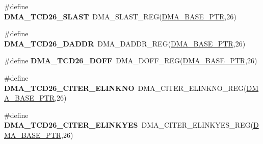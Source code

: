 \begin{DoxyCompactItemize}
\item 
\hypertarget{group___d_m_a___register___accessor___macros_ga3ab01c359b1b2da0d5bd711e9f1a3b26}{}\#define {\bfseries D\+M\+A\+\_\+\+T\+C\+D26\+\_\+\+S\+L\+A\+S\+T}~D\+M\+A\+\_\+\+S\+L\+A\+S\+T\+\_\+\+R\+E\+G(\hyperlink{group___d_m_a___peripheral_ga6997fbc1b1973e9f27170217a3bd6f22}{D\+M\+A\+\_\+\+B\+A\+S\+E\+\_\+\+P\+T\+R},26)\label{group___d_m_a___register___accessor___macros_ga3ab01c359b1b2da0d5bd711e9f1a3b26}

\item 
\hypertarget{group___d_m_a___register___accessor___macros_ga2e65796b0136423acaa261ad3a62a953}{}\#define {\bfseries D\+M\+A\+\_\+\+T\+C\+D26\+\_\+\+D\+A\+D\+D\+R}~D\+M\+A\+\_\+\+D\+A\+D\+D\+R\+\_\+\+R\+E\+G(\hyperlink{group___d_m_a___peripheral_ga6997fbc1b1973e9f27170217a3bd6f22}{D\+M\+A\+\_\+\+B\+A\+S\+E\+\_\+\+P\+T\+R},26)\label{group___d_m_a___register___accessor___macros_ga2e65796b0136423acaa261ad3a62a953}

\item 
\hypertarget{group___d_m_a___register___accessor___macros_gaa03c841d444e3a6a5818a22e141be9c7}{}\#define {\bfseries D\+M\+A\+\_\+\+T\+C\+D26\+\_\+\+D\+O\+F\+F}~D\+M\+A\+\_\+\+D\+O\+F\+F\+\_\+\+R\+E\+G(\hyperlink{group___d_m_a___peripheral_ga6997fbc1b1973e9f27170217a3bd6f22}{D\+M\+A\+\_\+\+B\+A\+S\+E\+\_\+\+P\+T\+R},26)\label{group___d_m_a___register___accessor___macros_gaa03c841d444e3a6a5818a22e141be9c7}

\item 
\hypertarget{group___d_m_a___register___accessor___macros_ga5737f472c52a28e521bc8208291067e9}{}\#define {\bfseries D\+M\+A\+\_\+\+T\+C\+D26\+\_\+\+C\+I\+T\+E\+R\+\_\+\+E\+L\+I\+N\+K\+N\+O}~D\+M\+A\+\_\+\+C\+I\+T\+E\+R\+\_\+\+E\+L\+I\+N\+K\+N\+O\+\_\+\+R\+E\+G(\hyperlink{group___d_m_a___peripheral_ga6997fbc1b1973e9f27170217a3bd6f22}{D\+M\+A\+\_\+\+B\+A\+S\+E\+\_\+\+P\+T\+R},26)\label{group___d_m_a___register___accessor___macros_ga5737f472c52a28e521bc8208291067e9}

\item 
\hypertarget{group___d_m_a___register___accessor___macros_ga38c3008c420a5439d51c41c4ea211bfb}{}\#define {\bfseries D\+M\+A\+\_\+\+T\+C\+D26\+\_\+\+C\+I\+T\+E\+R\+\_\+\+E\+L\+I\+N\+K\+Y\+E\+S}~D\+M\+A\+\_\+\+C\+I\+T\+E\+R\+\_\+\+E\+L\+I\+N\+K\+Y\+E\+S\+\_\+\+R\+E\+G(\hyperlink{group___d_m_a___peripheral_ga6997fbc1b1973e9f27170217a3bd6f22}{D\+M\+A\+\_\+\+B\+A\+S\+E\+\_\+\+P\+T\+R},26)\label{group___d_m_a___register___accessor___macros_ga38c3008c420a5439d51c41c4ea211bfb}


\end{DoxyCompactItemize}
